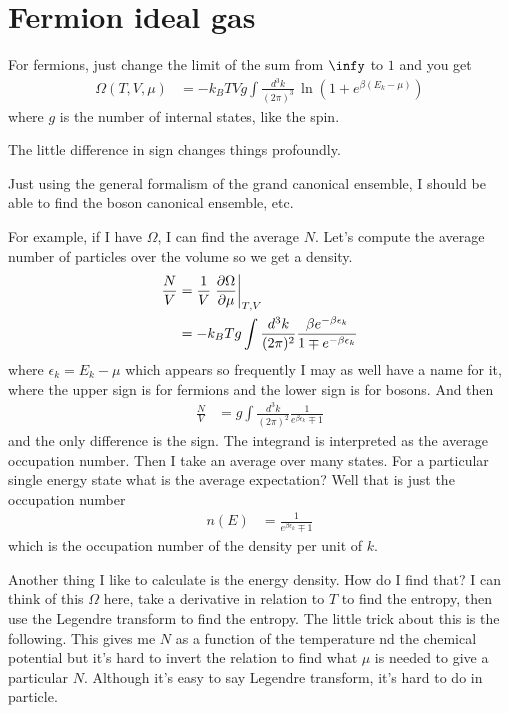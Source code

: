 \section{Fermion ideal gas}
For fermions,
just change the limit of the sum from $\infy$ to $1$
and you get
\begin{align}
    \Omega(T, V, \mu) &=
    -k_B T V g \int \frac{d^3k}{(2\pi)^3}\,
    \ln\left( 
    1 + e^{\beta(E_k - \mu)}
    \right)
\end{align}
where $g$ is the number of internal states,
like the spin.

The little difference in sign changes things profoundly.

Just using the general formalism of the grand canonical ensemble,
I should be able to find the boson canonical ensemble,
etc.


For example,
if I have $\Omega$,
I can find the average $N$.
Let's compute the average number of particles over the volume so we get a
density.
\begin{align}
    \frac{N}{V} &=
    \frac{1}{V}
    \left. \frac{\partial \Omega}{\partial\mu}\right|_{T,V}\\
    &=
    - k_B T g
    \int \frac{d^3k}{(2\pi)^2}
    \frac{ \beta e^{-\beta \epsilon_k}}{%
        1 \mp e^{-\beta \epsilon_k}
    }
\end{align}
where $\epsilon_k=E_k - \mu$ which appears so frequently I may as well have a
name for it,
where the upper sign is for fermions and the lower sign is for bosons.
And then
\begin{align}
    \frac{N}{V} &=
    g \int \frac{d^3k}{(2\pi)^2}
    \frac{1}{e^{\beta\epsilon_k}\mp 1}
\end{align}
and the only difference is the sign.
The integrand is interpreted as the average occupation number.
Then I take an average over many states.
For a particular single energy state
what is the average expectation?
Well that is just the occupation number
\begin{align}
    n(E) &=
    \frac{1}{e^{\beta\epsilon_k}\mp 1}
\end{align}
which is the occupation number of the density per unit of $k$.

Another thing I like to calculate is the energy density.
How do I find that?
I can think of this $\Omega$ here,
take a derivative in relation to $T$ to find the entropy,
then use the Legendre transform to find the entropy.
The little trick about this is the following.
This gives me $N$ as a function of the temperature nd the chemical potential
but it's hard to invert the relation to find what $\mu$ is needed to give
a particular $N$.
Although it's easy to say Legendre transform,
it's hard to do in particle.

